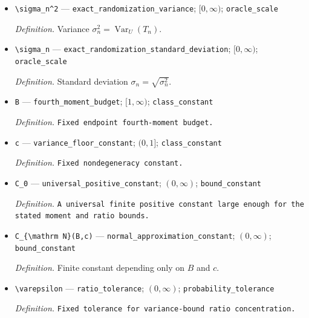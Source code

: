 \documentclass{article}
\begin{document}
\begin{itemize}
  \par\smallskip\noindent\emph{Definition.} Estimator \(T_n=n^{-1}\sum_{i\in\mathcal I_n}Y_{n,i}^{\mathrm{obs}}\{\mathbf 1(E_{n,i,1})-\mathbf 1(E_{n,i,0})\}/q_{n,i}\).
  \item \texttt{\textbackslash{}\allowbreak{}sigma\_\allowbreak{}n\textasciicircum{}2} --- \texttt{exact\_\allowbreak{}randomization\_\allowbreak{}variance}; \([0,\infty)\); \texttt{oracle\_\allowbreak{}scale}
  \par\smallskip\noindent\emph{Definition.} Variance \(\sigma_n^2=\operatorname{Var}_U(T_n)\).
  \item \texttt{\textbackslash{}\allowbreak{}sigma\_\allowbreak{}n} --- \texttt{exact\_\allowbreak{}randomization\_\allowbreak{}standard\_\allowbreak{}deviation}; \([0,\infty)\); \texttt{oracle\_\allowbreak{}scale}
  \par\smallskip\noindent\emph{Definition.} Standard deviation \(\sigma_n=\sqrt{\sigma_n^2}\).
  \item \texttt{B} --- \texttt{fourth\_\allowbreak{}moment\_\allowbreak{}budget}; \([1,\infty)\); \texttt{class\_\allowbreak{}constant}
  \par\smallskip\noindent\emph{Definition.} \texttt{Fixed endpoint fourth-\allowbreak{}moment budget.}
  \item \texttt{c} --- \texttt{variance\_\allowbreak{}floor\_\allowbreak{}constant}; \((0,1]\); \texttt{class\_\allowbreak{}constant}
  \par\smallskip\noindent\emph{Definition.} \texttt{Fixed nondegeneracy constant.}
  \item \texttt{C\_\allowbreak{}0} --- \texttt{universal\_\allowbreak{}positive\_\allowbreak{}constant}; \((0,\infty)\); \texttt{bound\_\allowbreak{}constant}
  \par\smallskip\noindent\emph{Definition.} \texttt{A universal finite positive constant large enough for the stated moment and ratio bounds.}
  \item \texttt{C\_\allowbreak{}\{\textbackslash{}\allowbreak{}mathrm N\}\allowbreak{}(B,\allowbreak{}c)} --- \texttt{normal\_\allowbreak{}approximation\_\allowbreak{}constant}; \((0,\infty)\); \texttt{bound\_\allowbreak{}constant}
  \par\smallskip\noindent\emph{Definition.} Finite constant depending only on \(B\) and \(c\).
  \item \texttt{\textbackslash{}\allowbreak{}varepsilon} --- \texttt{ratio\_\allowbreak{}tolerance}; \((0,\infty)\); \texttt{probability\_\allowbreak{}tolerance}
  \par\smallskip\noindent\emph{Definition.} \texttt{Fixed tolerance for variance-\allowbreak{}bound ratio concentration.}

\end{itemize}
\end{document}
